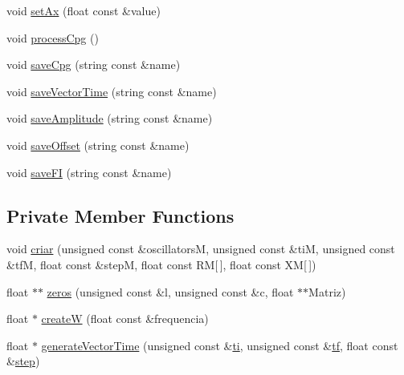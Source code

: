 \begin{DoxyCompactItemize}
\item 
void \hyperlink{classCpg_add9ec0364bbe3958d7eac5d059985d9c}{set\+Ax} (float const \&value)
\item 
void \hyperlink{classCpg_ad3bac9ebe928c26c6beb6a4084585dc1}{process\+Cpg} ()
\item 
void \hyperlink{classCpg_abd793d8f3c4ea00d3b6580ff9c2ee7d9}{save\+Cpg} (string const \&name)
\item 
void \hyperlink{classCpg_a96a93c0107065678c2de6486136f9cf8}{save\+Vector\+Time} (string const \&name)
\item 
void \hyperlink{classCpg_aec2020a46294886424682957f2d441a1}{save\+Amplitude} (string const \&name)
\item 
void \hyperlink{classCpg_acebfbe4919359a28df5477fd431306bc}{save\+Offset} (string const \&name)
\item 
void \hyperlink{classCpg_a572a47185ab8bbcbc241d7631ce73212}{save\+FI} (string const \&name)
\end{DoxyCompactItemize}
\subsection*{Private Member Functions}
\begin{DoxyCompactItemize}
\item 
void \hyperlink{classCpg_ad35216294fb2aa04bf75b7cc3628c35a}{criar} (unsigned const \&oscillatorsM, unsigned const \&tiM, unsigned const \&tfM, float const \&stepM, float const RM\mbox{[}$\,$\mbox{]}, float const XM\mbox{[}$\,$\mbox{]})
\item 
float $\ast$$\ast$ \hyperlink{classCpg_a4584d250ed6e8beace3ada7c0a28455a}{zeros} (unsigned const \&l, unsigned const \&c, float $\ast$$\ast$Matriz)
\item 
float $\ast$ \hyperlink{classCpg_a79402424076964ff90210050e79a35e7}{createW} (float const \&frequencia)
\item 
float $\ast$ \hyperlink{classCpg_adeeac0f667c5175da03bb2dce6efad68}{generate\+Vector\+Time} (unsigned const \&\hyperlink{classCpg_ae22d05d6332474232e17951527266c5e}{ti}, unsigned const \&\hyperlink{classCpg_ac0c4c837f76afff78feb182fe840d9b2}{tf}, float const \&\hyperlink{classCpg_ac401bdb453b48eb16f139c85cf84c50e}{step})
\end{DoxyCompactItemize}

